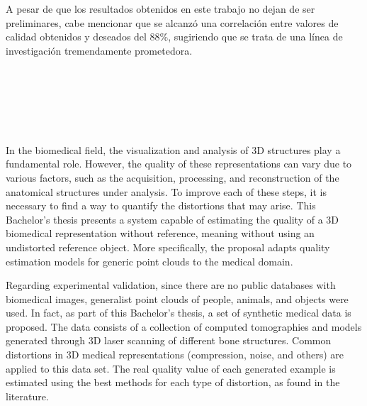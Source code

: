 A pesar de que los resultados obtenidos en este trabajo no dejan de ser preliminares, 
cabe mencionar que se alcanzó una correlación entre valores de calidad obtenidos y 
deseados del 88\%, sugiriendo que se trata de una línea de investigación tremendamente 
prometedora. 

\cleardoublepage


\thispagestyle{empty}


\begin{center}
{\large\bfseries \myTitleENG}\\
\end{center}
\begin{center}
\myName \\
\end{center}

\\

\\
In the biomedical field, the visualization and analysis of 3D structures 
play a fundamental role. However, the quality of these representations can vary 
due to various factors, such as the acquisition, processing, and reconstruction 
of the anatomical structures under analysis. To improve each of these steps, 
it is necessary to find a way to quantify the distortions that may arise. 
This Bachelor's thesis presents a system capable of estimating the quality of 
a 3D biomedical representation without reference, meaning without using an 
undistorted reference object. More specifically, the proposal adapts quality 
estimation models for generic point clouds to the medical domain.
\smallskip

Regarding experimental validation, since there are no public databases with 
biomedical images, generalist point clouds of people, animals, and objects were used. 
In fact, as part of this Bachelor's thesis, a set of synthetic medical data is 
proposed. The data consists of a collection of computed tomographies and models 
generated through 3D laser scanning of different bone structures. Common distortions 
in 3D medical representations (compression, noise, and others) are applied to this 
data set. The real quality value of each generated example is estimated using 
the best methods for each type of distortion, as found in the literature.
\smallskip

